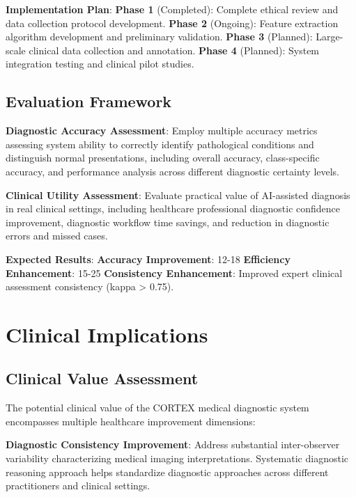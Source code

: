 \textbf{Implementation Plan}:
\textbf{Phase 1} (Completed): Complete ethical review and data collection protocol development.
\textbf{Phase 2} (Ongoing): Feature extraction algorithm development and preliminary validation.
\textbf{Phase 3} (Planned): Large-scale clinical data collection and annotation.
\textbf{Phase 4} (Planned): System integration testing and clinical pilot studies.

\subsection{Evaluation Framework}

\textbf{Diagnostic Accuracy Assessment}: Employ multiple accuracy metrics assessing system ability to correctly identify pathological conditions and distinguish normal presentations, including overall accuracy, class-specific accuracy, and performance analysis across different diagnostic certainty levels.

\textbf{Clinical Utility Assessment}: Evaluate practical value of AI-assisted diagnosis in real clinical settings, including healthcare professional diagnostic confidence improvement, diagnostic workflow time savings, and reduction in diagnostic errors and missed cases.

\textbf{Expected Results}:
\textbf{Accuracy Improvement}: 12-18%
\textbf{Efficiency Enhancement}: 15-25%
\textbf{Consistency Enhancement}: Improved expert clinical assessment consistency (kappa > 0.75).

\section{Clinical Implications}

\subsection{Clinical Value Assessment}

The potential clinical value of the CORTEX medical diagnostic system encompasses multiple healthcare improvement dimensions:

\textbf{Diagnostic Consistency Improvement}: Address substantial inter-observer variability characterizing medical imaging interpretations. Systematic diagnostic reasoning approach helps standardize diagnostic approaches across different practitioners and clinical settings.


